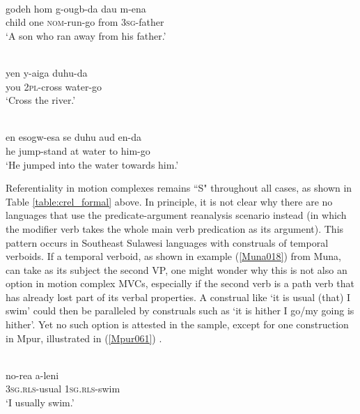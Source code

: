 \ea \label{Sougb002a}
\\
\gll godeh hom g-ougb-da dau m-ena \\
child one \textsc{nom}-run-go from \textsc{3}\textsc{sg}-father \\
\glft `A son who ran away from his father.' \\ 
\z

\ea
{}\\
\gll yen y-aiga duhu-da \\ 
you \textsc{2}\textsc{pl}-cross water-go \\
\glft `Cross the river.'\\ 
\z

\ea
{}\\
\gll en esogw-esa se duhu aud en-da \\ 
he jump-stand at water to him-go \\
\glft `He jumped into the water towards him.'\\ 
\z
\xe

Referentiality in motion complexes remains ``S" throughout all cases, as shown in Table \ref{table:crel_formal} above. In principle, it is not clear why there are no languages that use the predicate-argument reanalysis scenario instead (in which the modifier verb takes the whole main verb predication as its argument). This pattern occurs in Southeast Sulawesi languages with construals of temporal verboids. If a temporal verboid, as shown in example (\ref{Muna018}) from Muna, can take as its subject the second VP, one might wonder why this is not also an option in motion complex MVCs, especially if the second verb is a path verb that has already lost part of its verbal properties. A construal like `it is usual (that) I swim' could then be paralleled by construals such as `it is hither I go/my going is hither'. Yet no such option is attested in the sample, except for one construction in Mpur, illustrated in (\ref{Mpur061}) .

\ea \label{Muna018}
\\
\gll no-rea a-leni \\
\textsc{3}\textsc{sg}.\textsc{rls}-usual \textsc{1}\textsc{sg}.\textsc{rls}-swim \\
\glft `I usually swim.'\\ 
\z

